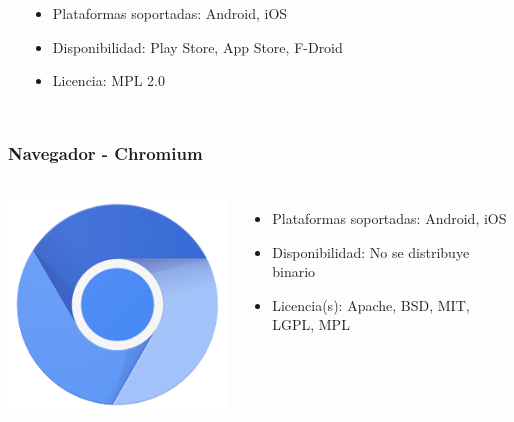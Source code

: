 \begin{frame}
\begin{columns}[c]
\begin{center}
            \end{center}
            \begin{itemize}
                \item Plataformas soportadas: Android, iOS
                \item Disponibilidad: Play Store, App Store, F-Droid
                \item Licencia: MPL 2.0
            \end{itemize}
    \end{columns}

\end{frame}

\begin{frame}

    \frametitle{Navegador - Chromium}

    \begin{columns}[c]
            \begin{center}
                \includegraphics[height=0.15\textheight]{images/chromium-logo.png}
            \end{center}
            \begin{itemize}
                \item Plataformas soportadas: Android, iOS
                \item Disponibilidad: No se distribuye binario
                \item Licencia(s): Apache, BSD, MIT, LGPL, MPL
            \end{itemize}
    \end{columns}

\end{frame}


